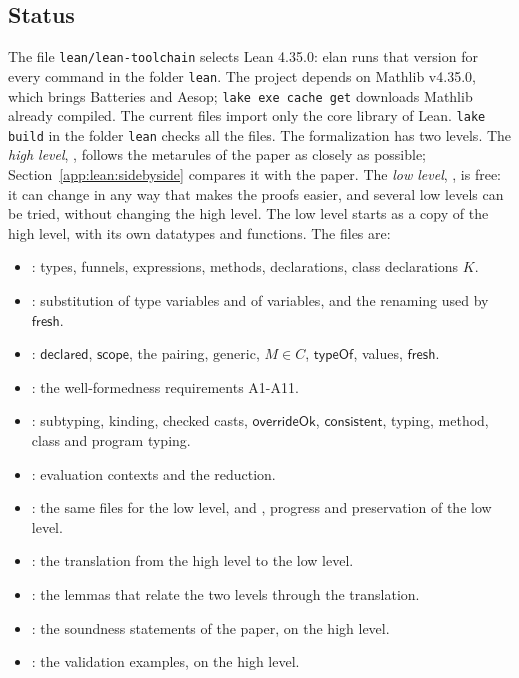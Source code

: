 \subsection{Status}
The file \texttt{lean/lean-toolchain} selects Lean 4.35.0: elan runs that version for every command in the folder \texttt{lean}.
The project depends on Mathlib v4.35.0, which brings Batteries and Aesop; \texttt{lake exe cache get} downloads Mathlib already compiled.
The current files import only the core library of Lean.
\texttt{lake build} in the folder \texttt{lean} checks all the files.
The formalization has two levels.
The \emph{high level}, , follows the metarules of the paper as closely as possible; Section~\ref{app:lean:sidebyside} compares it with the paper.
The \emph{low level}, , is free: it can change in any way that makes the proofs easier, and several low levels can be tried, without changing the high level.
The low level starts as a copy of the high level, with its own datatypes and functions.
The files are:
\begin{itemize}
\item {}: types, funnels, expressions, methods, declarations, class declarations $K$.
\item {}: substitution of type variables and of variables, and the renaming used by $\mathsf{fresh}$.
\item {}: $\mathsf{declared}$, $\mathsf{scope}$, the pairing, $\mathrm{generic}$, $M\in C$, $\mathsf{typeOf}$, values, $\mathsf{fresh}$.
\item {}: the well-formedness requirements A1-A11.
\item {}: subtyping, kinding, checked casts, $\mathsf{overrideOk}$, $\mathsf{consistent}$, typing, method, class and program typing.
\item {}: evaluation contexts and the reduction.
\item {}: the same files for the low level, and , progress and preservation of the low level.
\item {}: the translation from the high level to the low level.
\item {}: the lemmas that relate the two levels through the translation.
\item {}: the soundness statements of the paper, on the high level.
\item {}: the validation examples, on the high level.
\end{itemize}
